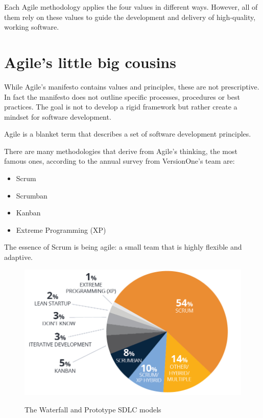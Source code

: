 	Each Agile methodology applies the four values in different ways.
	However, all of them rely on these values to guide the development and delivery of high-quality, working software.

\section{Agile's little big cousins}
	
	While Agile's manifesto contains values and principles, these are not prescriptive.
	In fact the manifesto does not outline specific processes, procedures or best practices.
	The goal is not to develop a rigid framework but rather create a mindset for software development.
	
	Agile is a blanket term that describes a set of software development principles.
	
	There are many methodologies that derive from Agile's thinking, the most famous ones, according to the annual survey from VersionOne's team are:
	\begin{itemize}
		\item Scrum
		\item Scrumban
		\item Kanban
		\item Extreme Programming (XP)
	\end{itemize}

	The essence of Scrum is being agile: a small team that is highly flexible and adaptive.

	\begin{figure}[H]
		\centering
		\includegraphics[width=.8\textwidth]{resources/agile-usage-chart}\\
		\caption{The Waterfall and Prototype SDLC models}
	\end{figure}

